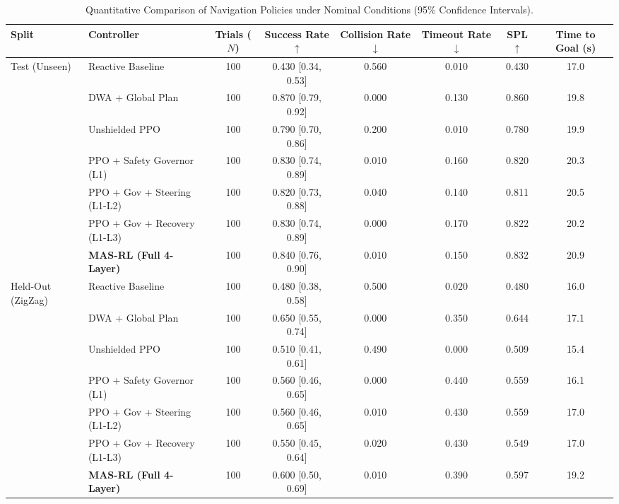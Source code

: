 \begin{table}[t]
\centering
\caption{Quantitative Comparison of Navigation Policies under Nominal Conditions (95\% Confidence Intervals).}
\label{tab:controller_comparison}
\begin{tabular}{llcccccc}
\hline\hline
\textbf{Split} & \textbf{Controller} & \textbf{Trials ($N$)} & \textbf{Success Rate} $\uparrow$ & \textbf{Collision Rate} $\downarrow$ & \textbf{Timeout Rate} $\downarrow$ & \textbf{SPL} $\uparrow$ & \textbf{Time to Goal (s)} \\
\hline
Test (Unseen) & Reactive Baseline & 100 & 0.430 [0.34, 0.53] & 0.560 & 0.010 & 0.430 & 17.0 \\
 & DWA + Global Plan & 100 & 0.870 [0.79, 0.92] & 0.000 & 0.130 & 0.860 & 19.8 \\
 & Unshielded PPO & 100 & 0.790 [0.70, 0.86] & 0.200 & 0.010 & 0.780 & 19.9 \\
 & PPO + Safety Governor (L1) & 100 & 0.830 [0.74, 0.89] & 0.010 & 0.160 & 0.820 & 20.3 \\
 & PPO + Gov + Steering (L1-L2) & 100 & 0.820 [0.73, 0.88] & 0.040 & 0.140 & 0.811 & 20.5 \\
 & PPO + Gov + Recovery (L1-L3) & 100 & 0.830 [0.74, 0.89] & 0.000 & 0.170 & 0.822 & 20.2 \\
 & \textbf{MAS-RL (Full 4-Layer)} & 100 & 0.840 [0.76, 0.90] & 0.010 & 0.150 & 0.832 & 20.9 \\
\hline
Held-Out (ZigZag) & Reactive Baseline & 100 & 0.480 [0.38, 0.58] & 0.500 & 0.020 & 0.480 & 16.0 \\
 & DWA + Global Plan & 100 & 0.650 [0.55, 0.74] & 0.000 & 0.350 & 0.644 & 17.1 \\
 & Unshielded PPO & 100 & 0.510 [0.41, 0.61] & 0.490 & 0.000 & 0.509 & 15.4 \\
 & PPO + Safety Governor (L1) & 100 & 0.560 [0.46, 0.65] & 0.000 & 0.440 & 0.559 & 16.1 \\
 & PPO + Gov + Steering (L1-L2) & 100 & 0.560 [0.46, 0.65] & 0.010 & 0.430 & 0.559 & 17.0 \\
 & PPO + Gov + Recovery (L1-L3) & 100 & 0.550 [0.45, 0.64] & 0.020 & 0.430 & 0.549 & 17.0 \\
 & \textbf{MAS-RL (Full 4-Layer)} & 100 & 0.600 [0.50, 0.69] & 0.010 & 0.390 & 0.597 & 19.2 \\
\hline
\hline\hline
\end{tabular}
\end{table}
